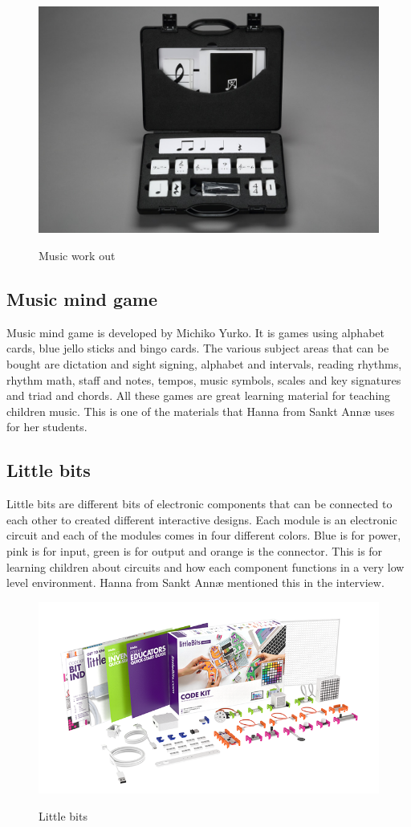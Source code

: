 \begin{figure}[H]
	\centering
	\includegraphics[width=0.7\linewidth]{figure/Analysis/musicworkout}
	\label{fig:musicworkout}
	\caption{Music work out}
\end{figure}

\subsection{Music mind game}
Music mind game is developed by Michiko Yurko. It is games using alphabet cards, blue jello sticks and bingo cards. The various subject areas that can be bought are dictation and sight signing, alphabet and intervals, reading rhythms, rhythm math, staff and notes, tempos, music symbols, scales and key signatures and triad and chords. All these games are great learning material for teaching children music. This is one of the materials that Hanna from Sankt Annæ uses for her students. 

\subsection{Little bits}
Little bits are different bits of electronic components that can be connected to each other to created different interactive designs. Each module is an electronic circuit and each of the modules comes in four different colors. Blue is for power, pink is for input, green is for output and orange is the connector. This is for learning children about circuits and how each component functions in a very low level environment. Hanna from Sankt Annæ mentioned this in the interview.

\begin{figure}[H]
	\centering
	\includegraphics[width=0.7\linewidth]{figure/Analysis/littlebits}
	\label{fig:littlebits}
	\caption{Little bits}
\end{figure}


